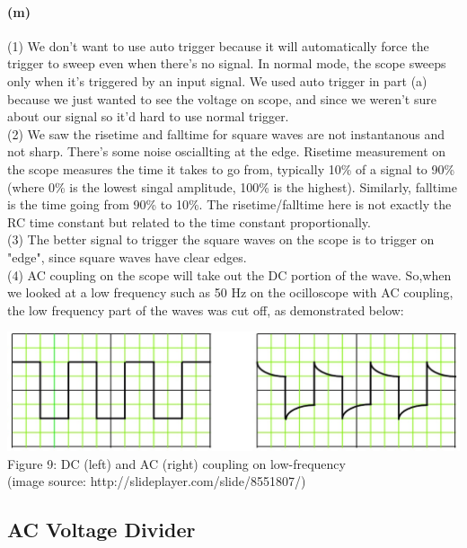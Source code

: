 \documentclass[]{article}
\begin{document}
	\paragraph{ (m)}
	(1) We don't want to use auto trigger because it will automatically force the trigger to sweep even when there's no signal. In normal mode, the scope sweeps only when it's triggered by an input signal. We used auto trigger in part (a) because we just wanted to see the voltage on scope, and since we weren't sure about our signal so it'd hard to use normal trigger.  \\
	(2) We saw the risetime and falltime for square waves are not instantanous and not sharp. There's some noise osciallting at the edge. Risetime measurement on the scope measures the time it takes to go from, typically 10\% of a signal to 90\% (where 0\% is the lowest singal amplitude, 100\% is the highest). Similarly, falltime is the time going from 90\% to 10\%. The risetime/falltime here is not exactly the RC time constant but related to the time constant proportionally.\\ 
	(3) The better signal to trigger the square waves on the scope is to trigger on "edge", since square waves have clear edges.\\
	(4) AC coupling on the scope will take out the DC portion of the wave. So,when we looked at a low frequency such as 50 Hz on the ocilloscope with AC coupling, the low frequency part of the waves was cut off, as demonstrated below:
		\begin{center} 
			\includegraphics[scale=0.3]{lab1_accoupling}\\			
			Figure 9: DC (left) and AC (right) coupling on low-frequency\\
			(image source: http://slideplayer.com/slide/8551807/)
		\end{center}

	
\subsection*{AC Voltage Divider}	
\end{document}
